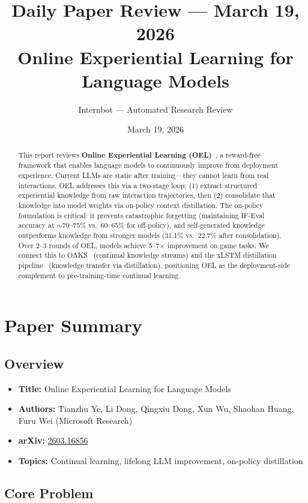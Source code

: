 \documentclass[11pt]{article}
\title{Daily Paper Review --- March 19, 2026\\
\large Online Experiential Learning for Language Models}
\author{Internbot --- Automated Research Review}
\date{March 19, 2026}
\begin{document}
\maketitle

\begin{abstract}
This report reviews \textbf{Online Experiential Learning (OEL)}~\cite{oel}, a reward-free framework that enables language models to continuously improve from deployment experience.
Current LLMs are static after training---they cannot learn from real interactions.
OEL addresses this via a two-stage loop: (1) extract structured experiential knowledge from raw interaction trajectories, then (2) consolidate that knowledge into model weights via on-policy context distillation.
The on-policy formulation is critical: it prevents catastrophic forgetting (maintaining IF-Eval accuracy at $\sim$70--75\% vs.\ 60--65\% for off-policy), and self-generated knowledge outperforms knowledge from stronger models (31.1\% vs.\ 22.7\% after consolidation).
Over 2--3 rounds of OEL, models achieve 5--7$\times$ improvement on game tasks.
We connect this to OAKS~\cite{oaks} (continual knowledge streams) and the xLSTM distillation pipeline~\cite{xlstm-distill} (knowledge transfer via distillation), positioning OEL as the deployment-side complement to pre-training-time continual learning.
\end{abstract}

\section{Paper Summary}

\subsection{Overview}
\begin{itemize}
    \item \textbf{Title:} Online Experiential Learning for Language Models
    \item \textbf{Authors:} Tianzhu Ye, Li Dong, Qingxiu Dong, Xun Wu, Shaohan Huang, Furu Wei (Microsoft Research)
    \item \textbf{arXiv:} \href{https://arxiv.org/abs/2603.16856}{2603.16856}
    \item \textbf{Topics:} Continual learning, lifelong LLM improvement, on-policy distillation
\end{itemize}

\subsection{Core Problem}
\end{document}
